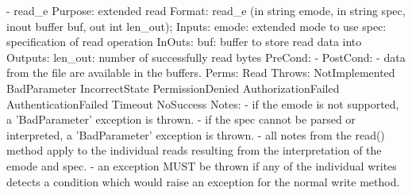 \begin{myspec}
 
    - read_e
      Purpose:  extended read
      Format:   read_e             (in    string      emode, 
                                    in    string      spec, 
                                    inout buffer      buf,  
                                    out   int         len_out); 
      Inputs:   emode:              extended mode to use
                spec:               specification of read 
                                    operation
      InOuts:   buf:                buffer to store read data
                                    into
      Outputs:  len_out:            number of successfully read
                                    bytes
      PreCond:  -
      PostCond: - data from the file are available in the
                  buffers.
      Perms:    Read
      Throws:   NotImplemented
                BadParameter
                IncorrectState
                PermissionDenied
                AuthorizationFailed
                AuthenticationFailed
                Timeout
                NoSuccess
      Notes:    - if the emode is not supported, a 'BadParameter'
                  exception is thrown.
                - if the spec cannot be parsed or interpreted,
                  a 'BadParameter' exception is thrown.
                - all notes from the read() method apply to the
                  individual reads resulting from the
                  interpretation of the emode and spec.
                - an exception MUST be thrown if any of the
                  individual writes detects a condition which
                  would raise an exception for the normal write
                  method.
 

\end{myspec}
